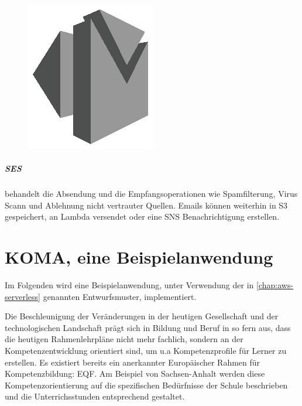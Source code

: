 \documentclass[
12pt,
english,
ngerman,
headsepline,
twoside,
openright,
numbers=noenddot,version=first
]{scrreprt}
\begin{document}
\begin{figure}
	\includegraphics[width=0.9\linewidth]{./pics/aws/Messaging_GRAYSCALE_AmazonSES.eps}
\end{figure}
\paragraph{\acrfull{SES}} behandelt die Absendung und die Empfangsoperationen wie Spamfilterung, Virus Scann und Ablehnung nicht vertrauter Quellen. Emails können weiterhin in \acrshort{S3} gespeichert, an Lambda versendet oder eine \acrshort{SNS} Benachrichtigung erstellen.

\chapter{KOMA, eine Beispielanwendung}\label{sec:KOMA} 
Im Folgenden wird eine Beispielanwendung, unter Verwendung der in \autoref{chap:aws-serverless} genannten Entwurfsmuster, implementiert.

Die Beschleunigung der Veränderungen in der heutigen Gesellschaft und der technologischen Landschaft prägt sich in Bildung und Beruf in so fern aus, dass die heutigen Rahmenlehrpläne nicht mehr fachlich, sondern an der Kompetenzentwicklung orientiert sind, um u.a Kompetenzprofile für Lerner zu erstellen. Es existiert bereits ein anerkannter Europäischer Rahmen\cite{EQF} für Kompetenzbildung: \acrfull{EQF}. Am Beispiel von Sachsen-Anhalt\cite{BildungsServerSachsen} werden diese Kompetenzorientierung auf die spezifischen Bedürfnisse der Schule beschrieben und die Unterrichsstunden entsprechend gestaltet.
\end{document}
